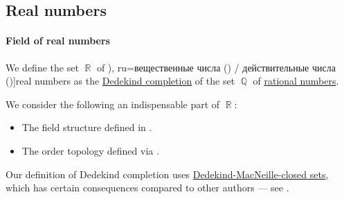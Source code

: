 \subsection{Real numbers}\label{subsec:real_numbers}

\paragraph{Field of real numbers}

\begin{definition}\label{def:real_numbers}
  We define the set \( \BbbR \) of \term[bg=реални числа (\cite[sec. 1.1.2]{Соскова2015}), ru=вещественные числа (\cite[]{ФихтенгольцОсновыТом1}) / действительные числа (\cite[36]{Александров1977Введение})]{real numbers} as the \hyperref[def:dedekind_completion]{Dedekind completion} of the set \( \BbbQ \) of \hyperref[def:rational_numbers]{rational numbers}.
\end{definition}
\begin{comments}
  \item We consider the following an indispensable part of \( \BbbR \):
  \begin{itemize}
    \item The field structure defined in .
    \item The order topology defined via .
  \end{itemize}

  \item Our definition of Dedekind completion uses \hyperref[def:dedekind_macnielle_closure]{Dedekind-MacNeille-closed sets}, which has certain consequences compared to other authors --- see .
\end{comments}

